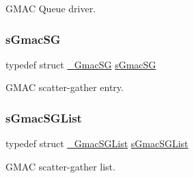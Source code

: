 G\+M\+AC Queue driver. \mbox{\label{group__gmacd__types_gab4ca53499e3bb0601f44e59e17ec7a51}} 
\subsubsection{\texorpdfstring{sGmacSG}{sGmacSG}}
{\footnotesize\ttfamily typedef struct \mbox{\hyperlink{struct__GmacSG}{\+\_\+\+Gmac\+SG}}  \mbox{\hyperlink{group__gmacd__types_gab4ca53499e3bb0601f44e59e17ec7a51}{s\+Gmac\+SG}}}

G\+M\+AC scatter-\/gather entry. \mbox{\label{group__gmacd__types_ga97ea4785757f8d33d38ed0563d84bfa4}} 
\subsubsection{\texorpdfstring{sGmacSGList}{sGmacSGList}}
{\footnotesize\ttfamily typedef struct \mbox{\hyperlink{struct__GmacSGList}{\+\_\+\+Gmac\+S\+G\+List}}  \mbox{\hyperlink{group__gmacd__types_ga97ea4785757f8d33d38ed0563d84bfa4}{s\+Gmac\+S\+G\+List}}}

G\+M\+AC scatter-\/gather list. 